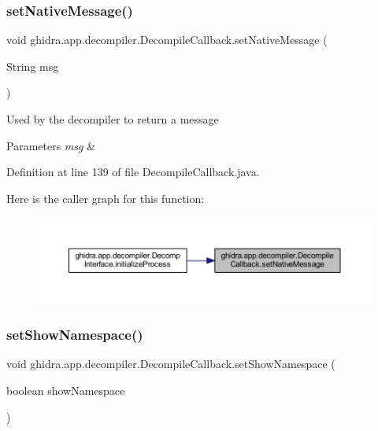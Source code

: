 \subsubsection{\texorpdfstring{setNativeMessage()}{setNativeMessage()}}
{\footnotesize\ttfamily void ghidra.\+app.\+decompiler.\+Decompile\+Callback.\+set\+Native\+Message (\begin{DoxyParamCaption}\item[{String}]{msg }\end{DoxyParamCaption})\hspace{0.3cm}{\ttfamily [inline]}}

Used by the decompiler to return a message


\begin{DoxyParams}{Parameters}
{\em msg} & \\
\hline
\end{DoxyParams}


Definition at line 139 of file Decompile\+Callback.\+java.

Here is the caller graph for this function\+:
\nopagebreak
\begin{figure}[H]
\begin{center}
\leavevmode
\includegraphics[width=350pt]{classghidra_1_1app_1_1decompiler_1_1_decompile_callback_a231f5ee7ae38619c786870ec0bd45744_icgraph}
\end{center}
\end{figure}
\mbox{\label{classghidra_1_1app_1_1decompiler_1_1_decompile_callback_a821d08d61bdfaaf11784912f935f3cc1}} 
\subsubsection{\texorpdfstring{setShowNamespace()}{setShowNamespace()}}
{\footnotesize\ttfamily void ghidra.\+app.\+decompiler.\+Decompile\+Callback.\+set\+Show\+Namespace (\begin{DoxyParamCaption}\item[{boolean}]{show\+Namespace }\end{DoxyParamCaption})\hspace{0.3cm}{\ttfamily [inline]}}



